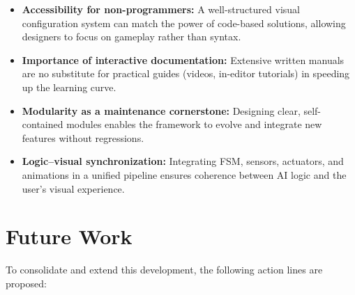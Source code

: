 \begin{itemize}
  \item \textbf{Accessibility for non-programmers:} A well-structured visual configuration system can match the power of code-based solutions, allowing designers to focus on gameplay rather than syntax.
  \item \textbf{Importance of interactive documentation:} Extensive written manuals are no substitute for practical guides (videos, in-editor tutorials) in speeding up the learning curve.
  \item \textbf{Modularity as a maintenance cornerstone:} Designing clear, self-contained modules enables the framework to evolve and integrate new features without regressions.
  \item \textbf{Logic–visual synchronization:} Integrating FSM, sensors, actuators, and animations in a unified pipeline ensures coherence between AI logic and the user’s visual experience.
\end{itemize}

\section*{Future Work}

To consolidate and extend this development, the following action lines are proposed:

